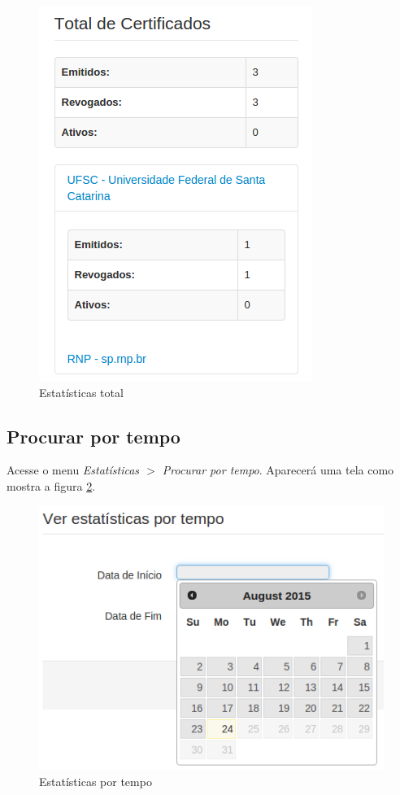 \begin{figure}[ht]
     \centering
     \includegraphics[scale=0.6]{images/estatisticatotal.png}
     \caption{Estatísticas total}
     \label{fig:estotal}
\end{figure}

\subsection{Procurar por tempo}

Acesse o menu \textit{Estatísticas $>$ Procurar por tempo}. Aparecerá uma tela como mostra a figura \ref{fig:estempo}.

\begin{figure}[ht]
     \centering
     \includegraphics[scale=0.5]{images/estatisticatempo.png}
     \caption{Estatísticas por tempo}
     \label{fig:estempo}
\end{figure}

